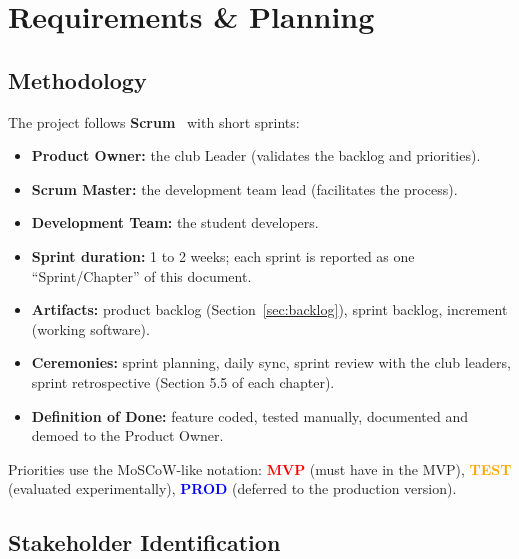 \documentclass[12pt,a4paper]{report}
\newcommand{\vprio}{\textcolor{red}{\textbf{MVP}}}
\newcommand{\pprio}{\textcolor{blue}{\textbf{PROD}}}
\newcommand{\testprio}{\textcolor{orange}{\textbf{TEST}}}
\begin{document}
\chapter{Requirements \& Planning}

\section{Methodology}

The project follows \textbf{Scrum}~\cite{scrumguide} with short sprints:

\begin{itemize}[leftmargin=*]
    \item \textbf{Product Owner:} the club Leader (validates the backlog and priorities).
    \item \textbf{Scrum Master:} the development team lead (facilitates the process).
    \item \textbf{Development Team:} the student developers.
    \item \textbf{Sprint duration:} 1 to 2 weeks; each sprint is reported as one
          ``Sprint/Chapter'' of this document.
    \item \textbf{Artifacts:} product backlog (Section~\ref{sec:backlog}), sprint backlog,
          increment (working software).
    \item \textbf{Ceremonies:} sprint planning, daily sync, sprint review with the club
          leaders, sprint retrospective (Section 5.5 of each chapter).
    \item \textbf{Definition of Done:} feature coded, tested manually, documented and
          demoed to the Product Owner.
\end{itemize}

Priorities use the MoSCoW-like notation: \vprio{} (must have in the MVP),
\testprio{} (evaluated experimentally), \pprio{} (deferred to the production version).

\section{Stakeholder Identification}
\end{document}
